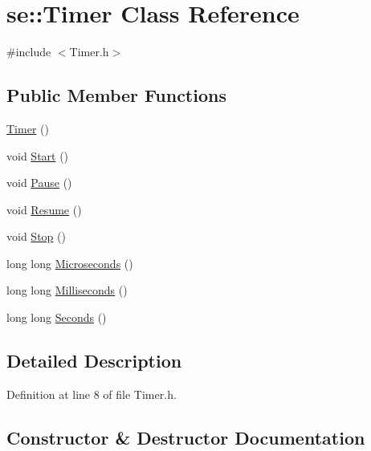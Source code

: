 \hypertarget{classse_1_1_timer}{}\section{se\+:\+:Timer Class Reference}
\label{classse_1_1_timer}


{\ttfamily \#include $<$Timer.\+h$>$}

\subsection*{Public Member Functions}
\begin{DoxyCompactItemize}
\item 
\mbox{\hyperlink{classse_1_1_timer_a0f3bf62bd9419c252910191f13669dd7}{Timer}} ()
\item 
void \mbox{\hyperlink{classse_1_1_timer_a0294f5629a28a1e169a8d1b5ab179273}{Start}} ()
\item 
void \mbox{\hyperlink{classse_1_1_timer_abde91d5d6e7fe0601c0c9607193707d8}{Pause}} ()
\item 
void \mbox{\hyperlink{classse_1_1_timer_a432406f463e02336c1033d65ae1d746e}{Resume}} ()
\item 
void \mbox{\hyperlink{classse_1_1_timer_aed6b34f75ec989731c80fefe962493f3}{Stop}} ()
\item 
long long \mbox{\hyperlink{classse_1_1_timer_a7fdf38aafc8be894fc25764ff8cabb36}{Microseconds}} ()
\item 
long long \mbox{\hyperlink{classse_1_1_timer_a9c3fe064b6637f2804c370da786a38d8}{Milliseconds}} ()
\item 
long long \mbox{\hyperlink{classse_1_1_timer_a258761c48271338588503d8170532bde}{Seconds}} ()
\end{DoxyCompactItemize}


\subsection{Detailed Description}


Definition at line 8 of file Timer.\+h.



\subsection{Constructor \& Destructor Documentation}
\mbox{\label{classse_1_1_timer_a0f3bf62bd9419c252910191f13669dd7}} 
